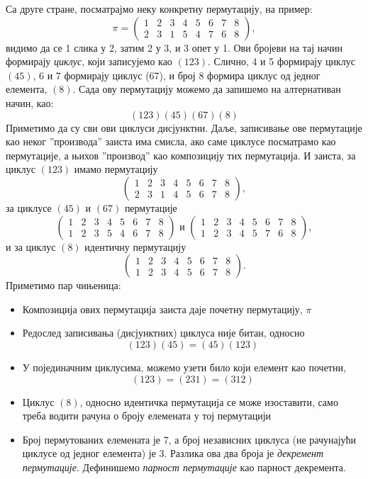 \documentclass{report}
\theoremstyle{plain}
\theoremstyle{definition}
\begin{document}
Са друге стране, посматрајмо неку конкретну пермутацију, на пример:
$$\pi = \begin{pmatrix}
    1 & 2 & 3 & 4 & 5 & 6 & 7 & 8 \\
    2 & 3 & 1 & 5 & 4 & 7 & 6 & 8
  \end{pmatrix},$$
видимо да се 1 слика у 2, затим 2 у 3, и 3 опет у 1. Ови бројеви на тај начин формирају \emph{циклус}, који записујемо као $(123)$. Слично, 4 и 5 формирају циклус $(45)$, 6 и 7 формирају циклус (67), и број 8 формира циклус од једног елемента, $(8)$. Сада ову пермутацију можемо да запишемо на алтернативан начин, као:
$$(123)(45)(67)(8)$$
Приметимо да су сви ови циклуси дисјунктни. Даље, записивање ове пермутације као неког ''производа'' заиста има смисла, ако саме циклусе посматрамо као пермутације, а њихов ''производ'' као композицију тих пермутација. И заиста, за циклус $(123)$ имамо пермутацију
$$\begin{pmatrix}
    1 & 2 & 3 & 4 & 5 & 6 & 7 & 8 \\
    2 & 3 & 1 & 4 & 5 & 6 & 7 & 8
  \end{pmatrix},$$
за циклусе $(45)$ и $(67)$ пермутације
$$\begin{pmatrix}
    1 & 2 & 3 & 4 & 5 & 6 & 7 & 8 \\
    1 & 2 & 3 & 5 & 4 & 6 & 7 & 8
  \end{pmatrix} \text{ и }
  \begin{pmatrix}
    1 & 2 & 3 & 4 & 5 & 6 & 7 & 8 \\
    1 & 2 & 3 & 4 & 5 & 7 & 6 & 8
  \end{pmatrix},$$
и за циклус $(8)$ идентичну пермутацију
$$\begin{pmatrix}
    1 & 2 & 3 & 4 & 5 & 6 & 7 & 8 \\
    1 & 2 & 3 & 4 & 5 & 6 & 7 & 8
  \end{pmatrix}.$$
Приметимо пар чињеница:
\begin{itemize}
  \item Композиција ових пермутација заиста даје почетну пермутацију, $\pi$
  \item Редослед записивања (дисјунктних) циклуса није битан, односно
  $$(123)(45) = (45)(123)$$
  \item У појединачним циклусима, можемо узети било који елемент као почетни,
  $$(123) = (231) = (312)$$
  \item Циклус $(8)$, односно идентичка пермутација се може изоставити, само треба водити рачуна о броју елемената у тој пермутацији
  \item Број пермутованих елемената је 7, а број независних циклуса (не рачунајући циклусе од једног елемента) је 3. Разлика ова два броја је \emph{декремент пермутације}. Дефинишемо \emph{парност пермутације} као парност декремента.
\end{itemize}
\end{document}
